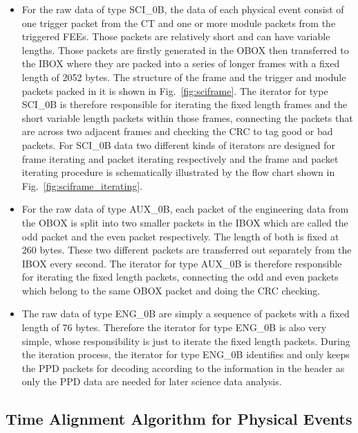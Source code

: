 \documentclass{raa}
\begin{document}
\begin{itemize}

\item For the raw data of type SCI\_0B, the data of each physical event consist of one trigger packet from the CT and one or more module packets from the triggered FEEs. Those packets are relatively short and can have variable lengths. Those packets are firstly generated in the OBOX then transferred to the IBOX where they are packed into a series of longer frames with a fixed length of 2052 bytes. The structure of the frame and the trigger and module packets packed in it is shown in Fig.~\ref{fig:sciframe}. The iterator for type SCI\_0B is therefore responsible for iterating the fixed length frames and the short variable length packets within those frames, connecting the packets that are across two adjacent frames and checking the CRC to tag good or bad packets. For SCI\_0B data two different kinds of iterators are designed for frame iterating and packet iterating respectively and the frame and packet iterating procedure is schematically illustrated by the flow chart shown in Fig.~\ref{fig:sciframe_iterating}.

\item For the raw data of type AUX\_0B, each packet of the engineering data from the OBOX is split into two smaller packets in the IBOX which are called the odd packet and the even packet respectively. The length of both is fixed at 260 bytes. These two different packets are transferred out separately from the IBOX every second. The iterator for type AUX\_0B is therefore responsible for iterating the fixed length packets, connecting the odd and even packets which belong to the same OBOX packet and doing the CRC checking.

\item The raw data of type ENG\_0B are simply a sequence of packets with a fixed length of 76 bytes. Therefore the iterator for type ENG\_0B is also very simple, whose responsibility is just to iterate the fixed length packets. During the iteration process, the iterator for type ENG\_0B identifies and only keeps the PPD packets for decoding according to the information in the header as only the PPD data are needed for later science data analysis.

\end{itemize}

\subsection{Time Alignment Algorithm for Physical Events} \label{sec:time_alignment}
\end{document}
